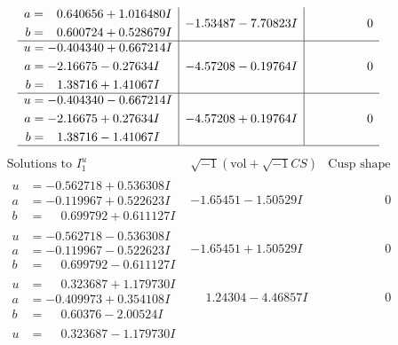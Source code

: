 \documentclass[1p]{elsarticle_modified}
\theoremstyle{definition}
\newcommand{\I}{\sqrt{-1}}
\begin{document}
$$\begin{array}{c|c|c}
\begin{aligned}
a &= \phantom{-}0.640656 + 1.016480 I \\
b &= \phantom{-}0.600724 + 0.528679 I\end{aligned}
 & -1.53487 - 7.70823 I & \phantom{-0.000000 } 0 \\ \hline\begin{aligned}
u &= -0.404340 + 0.667214 I \\
a &= -2.16675 - 0.27634 I \\
b &= \phantom{-}1.38716 + 1.41067 I\end{aligned}
 & -4.57208 - 0.19764 I & \phantom{-0.000000 } 0 \\ \hline\begin{aligned}
u &= -0.404340 - 0.667214 I \\
a &= -2.16675 + 0.27634 I \\
b &= \phantom{-}1.38716 - 1.41067 I\end{aligned}
 & -4.57208 + 0.19764 I & \phantom{-0.000000 } 0\\
 \hline 
 \end{array}$$\newpage$$\begin{array}{c|c|c}  
\text{Solutions to }I^u_{1}& \I (\text{vol} + \sqrt{-1}CS) & \text{Cusp shape}\\
 \hline 
\begin{aligned}
u &= -0.562718 + 0.536308 I \\
a &= -0.119967 + 0.522623 I \\
b &= \phantom{-}0.699792 + 0.611127 I\end{aligned}
 & -1.65451 - 1.50529 I & \phantom{-0.000000 } 0 \\ \hline\begin{aligned}
u &= -0.562718 - 0.536308 I \\
a &= -0.119967 - 0.522623 I \\
b &= \phantom{-}0.699792 - 0.611127 I\end{aligned}
 & -1.65451 + 1.50529 I & \phantom{-0.000000 } 0 \\ \hline\begin{aligned}
u &= \phantom{-}0.323687 + 1.179730 I \\
a &= -0.409973 + 0.354108 I \\
b &= \phantom{-}0.60376 - 2.00524 I\end{aligned}
 & \phantom{-}1.24304 - 4.46857 I & \phantom{-0.000000 } 0 \\ \hline\begin{aligned}
u &= \phantom{-}0.323687 - 1.179730 I \\

\end{aligned}
\end{array}$$
\end{document}
